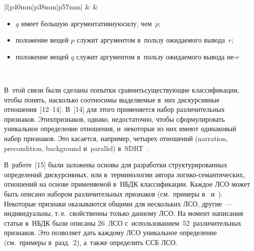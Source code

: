 \begin{multicols}{2}
\begin{table*}[b]
\begin{center}
\begin{tabular}{|l|p{40mm}|p{38mm}|p{57mm}|}
&
&
 \begin{itemize}
 \item $q$ имеет большую аргументативную\newline силу, чем~$p$;\vspace*{-3pt}
  \item положение вещей $p$ служит аргументом в~пользу ожи\-да\-емо\-го вывода~$r$;\vspace*{-3pt}
  \item положение вещей $q$ служит аргументом в~пользу ожи\-да\-емо\-го вывода не-$r$\vspace*{-8pt}
  \end{itemize}\\
\hline
\end{tabular}
\end{center}
\end{table*}
  
  В~этой связи были сделаны попытки сравнить\linebreak существующие 
классификации, чтобы понять, насколько соотносимы выделяемые в~них 
дискурсивные отношения~[12--14]. В~[14] для этого применяется 
набор различительных признаков. Этих\linebreak признаков, однако, недостаточно, чтобы 
сформулировать уникальное определение отношения, и~некоторые из них 
имеют одинаковый набор признаков. Это касается, например, четырех 
отношений (narration, precondition, background и~parallel) в~SDRT~\cite[с.~38]{14-in}. 
  
  В~работе~[15] были заложены основы для разработки структурированных 
определений дискурсивных, или в~терминологии автора  
ло\-ги\-ко-се\-ман\-ти\-че\-ских, отношений на основе применяемой 
в~НБДК классификации. Каждое 
ЛСО может быть описано набором различительных признаков (см.\ примеры 
в~\cite{16-in} и~\cite{17-in}). Некоторые признаки оказываются общими для 
нескольких ЛСО, другие~--- индивидуальны, т.\,е.\ свойственны только данному 
ЛСО. На момент написания статьи в~НБДК были описаны 26~ЛСО 
с~использованием~52~различительных признаков. Это позволяет дать каждому 
ЛСО уникальное определение (см.\ примеры в~разд.~2), а~также определить 
ССБ ЛСО. 


\end{multicols}
